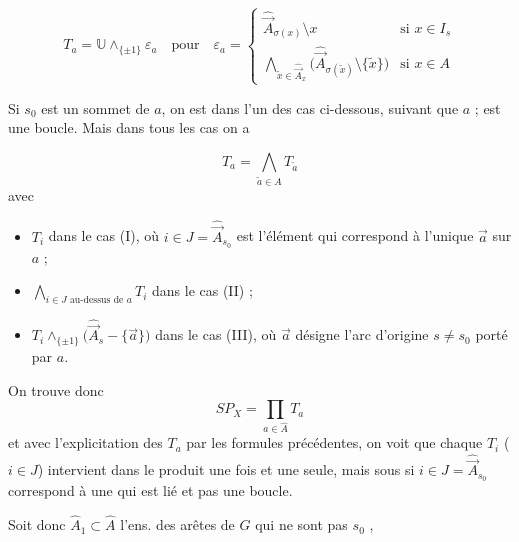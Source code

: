 \documentclass[11pt,a4paper]{article}
\begin{document}
\[
T_a = \mathbb{U} \wedge_{\{\pm 1\}} \varepsilon_a
\quad \text{pour} \quad
\varepsilon_a =
\begin{cases}
\hat{\vec{A}}_{\sigma(x)} \setminus x & \text{si } x \in I_s \\
\bigwedge_{\tilde{x} \in \hat{\vec{A}}_x} \bigl( \hat{\vec{A}}_{\sigma(\tilde{x})} \setminus \{\tilde{x}\} \bigr) & \text{si } x \in A
\end{cases}
\]

 Si $s_0$ est un sommet de $a$, on est dans l'un des
 cas ci-dessous, suivant que $a$ 
\add{\ill{}} ; est une boucle. \struck{\ill{}} Mais dans tous les cas on a


\[
T_a = \bigwedge_{\tilde{a} \in A} T_{\tilde{a}}
\]
avec
\begin{itemize}
  \item $T_i$ dans le cas (I), où $i \in J = \hat{\vec{A}}_{s_0}$ est l'élément qui correspond à l'unique $\vec{a}$ sur $a$ ;
  \item $\bigwedge_{i \in J \text{ au-dessus de } a} T_i$ dans le cas (II) ;
  \item $T_i \wedge_{\{\pm 1\}} \bigl( \hat{\vec{A}}_s - \{\vec{a}\} \bigr)$ dans le cas (III), où $\vec{a}$ désigne l'arc d'origine $s \neq s_0$ porté par $a$.
\end{itemize}

On trouve donc
\[
SP_X = \prod_{a \in \hat{A}} T_a
\]
et avec l'explicitation des $T_a$ par les formules précédentes, on voit que
chaque $T_i$ ($i \in J$) intervient dans le produit une fois et une seule,
mais sous  si $i \in J = \hat{\vec{A}}_{s_0}$
correspond à une \ill{} qui est lié et pas une boucle.

Soit donc $\hat{A}_1 \subset \hat{A}$ l'ens. des arêtes de $G$ qui ne sont pas
  $s_0$ ,
 

\end{document}
